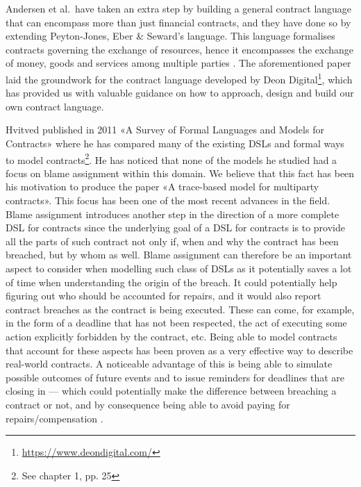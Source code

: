 \documentclass{ituthesis}
\begin{document}
Andersen et al.\ have taken an extra step by building a general contract language that can encompass more than just financial contracts, and they have done so by extending Peyton-Jones, Eber \& Seward's language. This language formalises contracts governing the exchange of resources, hence it encompasses the exchange of money, goods and services among multiple parties \cite{andersen2006compositional}. The aforementioned paper laid the groundwork for the contract language developed by Deon Digital\footnote{\url{https://www.deondigital.com/}}, which has provided us with valuable guidance on how to approach, design and build our own contract language.

Hvitved published in 2011 «A Survey of Formal Languages and Models for Contracts» where he has compared many of the existing DSLs and formal ways to model contracts\footnote{See \cite{hvitved2011contract} chapter 1, pp. 25}. He has noticed that none of the models he studied had a focus on blame assignment within this domain. We believe that this fact has been his motivation to produce the paper «A trace-based model for multiparty contracts». This focus has been one of the most recent advances in the field. Blame assignment introduces another step in the direction of a more complete DSL for contracts since the underlying goal of a DSL for contracts is to provide all the parts of such contract not only if, when and why the contract has been breached, but by whom as well. Blame assignment can therefore be an important aspect to consider when modelling such class of DSLs as it potentially saves a lot of time when understanding the origin of the breach. It could potentially help figuring out who should be accounted for repairs, and it would also report contract breaches as the contract is being executed. These can come, for example, in the form of a deadline that has not been respected, the act of executing some action explicitly forbidden by the contract, etc. Being able to model contracts that account for these aspects has been proven as a very effective way to describe real-world contracts. A noticeable advantage of this is being able to simulate possible outcomes of future events and to issue reminders for deadlines that are closing in --- which could potentially make the difference between breaching a contract or not, and by consequence being able to avoid paying for repairs/compensation \cite{hvitved2012trace}.
\end{document}
